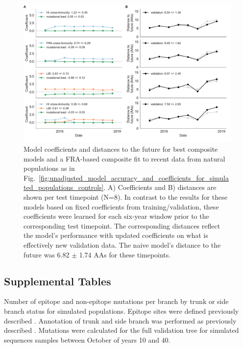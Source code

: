 \begin{figure}[H]
  \begin{center}
  \includegraphics[width=\textwidth]{figures/models-natural-populations-composite-with-updated-coefficients-across-test-data.pdf}
  \caption{
    Model coefficients and distances to the future for best composite models and a FRA-based composite fit to recent data from natural populations as in Fig.~\ref{fig:unadjusted_model_accuracy_and_coefficients_for_simulated_populations_controls}.
    A) Coefficients and B) distances are shown per test timepoint (N=8).
    In contrast to the results for these models based on fixed coefficients from training/validation, these coefficients were learned for each six-year window prior to the corresponding test timepoint.
    The corresponding distances reflect the model's performance with updated coefficients on what is effectively new validation data.
    The naive model's distance to the future was 6.82 $\pm$ 1.74 AAs for these timepoints.
  }
  \label{sup_fig:updated_model_accuracy_and_coefficients_for_natural_populations_across_test_data}
  \end{center}
\end{figure}

\subsection*{Supplemental Tables}

\begin{table}[H]
  \begin{center}
    
    \caption{
    Number of epitope and non-epitope mutations per branch by trunk or side branch status for simulated populations.
    Epitope sites were defined previously described \cite{Luksza:2014hj}.
    Annotation of trunk and side branch was performed as previously described \cite{Bedford:2015fj}.
    Mutations were calculated for the full validation tree for simulated sequences samples between October of years 10 and 40.
    }
    \label{sup_table:mutations_by_trunk_status_for_simulated_populations}
  \end{center}
\end{table}

